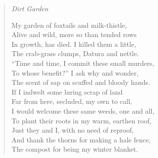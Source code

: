 \documentclass[12pt,oneside]{memoir}
\begin{document}
\begin{verse}
\emph{Dirt Garden}

My garden of foxtails and milk-thistle, \\
Alive and wild, more so than tended rows \\
In growth, has died. I killed them a little, \\
The crab-grass clumps, Datura and nettle. \\
``Time and time, I commit these small murders, \\
To whose benefit?'' I ask why and wonder, \\
The scent of sap on scuffed and bloody hands. \\
If I indwelt some luring scrap of land \\
Far from here, secluded, my own to call, \\
I would welcome these same weeds, one and all, \\
To plant their roots in my warm, earthen roof, \\
Just they and I, with no need of reproof, \\
And thank the thorns for making a hale fence, \\
The compost for being my winter blanket.

\parencite[5]{leaves}
\end{verse}
\end{document}
